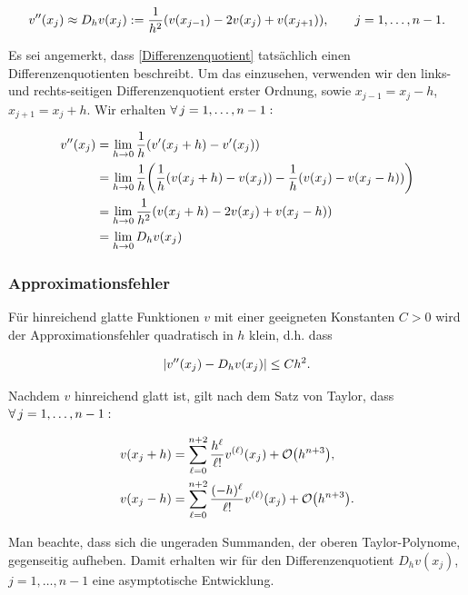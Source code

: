 \begin{align} %
  v^\primeprime(x_j) \approx
  D_h v(x_j) :=
  \frac{1}{h^2} (v(x_{j-1}) - 2 v(x_j) + v(x_{j+1})), \qquad
  j = 1, \ldots, n-1.
\end{align}

Es sei angemerkt, dass \eqref{Differenzenquotient} tatsächlich einen Differenzenquotienten beschreibt. Um das einzusehen, verwenden wir den links- und rechts-seitigen Differenzenquotient erster Ordnung, sowie $x_{j-1} = x_j - h$, $x_{j+1} = x_j + h$. Wir erhalten $\forall \, j = 1, \ldots, n-1:$

\begin{align*}
  v^{\prime \prime}(x_j)
  & = \lim_{h \to 0}
      \frac{1}{h} {\left ( 
        v^\prime(x_j + h) - v^\prime(x_j)
       \right )} \\
  & = \lim_{h \to 0}
      \frac{1}{h} {\left ( 
        \frac{1}{h} {\left ( 
          v(x_j + h) - v(x_j)
         \right )} -
        \frac{1}{h} {\left ( 
          v(x_j) - v(x_j - h)
         \right )}
       \right )} \\
  & = \lim_{h \to 0}
      \frac{1}{h^2} {\left ( 
        v(x_j + h) - 2 v(x_j) + v(x_j - h)
       \right )} \\
  & = \lim_{h \to 0}
      D_h v(x_j)
\end{align*}

\subsubsection{Approximationsfehler}

Für hinreichend glatte Funktionen $v$ mit einer geeigneten Konstanten $C > 0$ wird der Approximationsfehler quadratisch in $h$ klein, d.h. dass

\begin{align} \label{quadratische_Konvergenz}
  {\left | v^{\prime \prime}(x_j) - D_h v(x_j) \right |} \leq C h^2.
\end{align}

Nachdem $v$ hinreichend glatt ist, gilt nach dem Satz von Taylor, dass $\forall \, j = 1, \ldots, n-1:$

\begin{align*}
  v(x_j + h) & =
  \sum_{\ell = 0}^{n+2}
  \frac{h^\ell}{\ell !}
  v^{(\ell)}(x_j) +
  \mathcal{O} {\left ( h^{n+3} \right )}, \\
  v(x_j - h) & =
  \sum_{\ell = 0}^{n+2}
  \frac{(-h)^\ell}{\ell !}
  v^{(\ell)}(x_j) +
  \mathcal{O} {\left ( h^{n+3} \right )}.
\end{align*}

Man beachte, dass sich die ungeraden Summanden, der oberen Taylor-Polynome, gegenseitig aufheben. Damit erhalten wir für den Differenzenquotient $D_h v(x_j)$, $j = 1, \ldots, n-1$ eine asymptotische Entwicklung.

